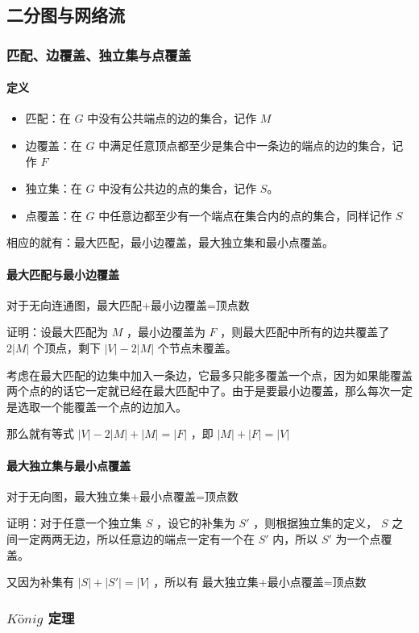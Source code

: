 \documentclass[UTF-8]{ctexart}
\begin{document}
		\subsection{二分图与网络流}
			\subsubsection{匹配、边覆盖、独立集与点覆盖}
			\paragraph{定义}
			\begin{itemize}
				\item 匹配：在 $G$ 中没有公共端点的边的集合，记作 $M$
				\item 边覆盖：在 $G$ 中满足任意顶点都至少是集合中一条边的端点的边的集合，记作 $F$
				\item 独立集：在 $G$ 中没有公共边的点的集合，记作 $S$。
				\item 点覆盖：在 $G$ 中任意边都至少有一个端点在集合内的点的集合，同样记作 $S$
			\end{itemize}
			相应的就有：最大匹配，最小边覆盖，最大独立集和最小点覆盖。
			\paragraph{最大匹配与最小边覆盖} 对于无向连通图，最大匹配+最小边覆盖=顶点数
			
			证明：设最大匹配为 $M$ ，最小边覆盖为 $F$ ，则最大匹配中所有的边共覆盖了 $2|M|$ 个顶点，剩下 $|V|-2|M|$ 个节点未覆盖。
			
			考虑在最大匹配的边集中加入一条边，它最多只能多覆盖一个点，因为如果能覆盖两个点的的话它一定就已经在最大匹配中了。由于是要最小边覆盖，那么每次一定是选取一个能覆盖一个点的边加入。
			
			那么就有等式 $|V|-2|M|+|M|=|F|$ ，即 $|M|+|F|=|V|$
			
			\paragraph{最大独立集与最小点覆盖} 对于无向图，最大独立集+最小点覆盖=顶点数
			
			证明：对于任意一个独立集 $S$ ，设它的补集为 $S'$ ，则根据独立集的定义， $S$ 之间一定两两无边，所以任意边的端点一定有一个在 $S'$ 内，所以 $S'$ 为一个点覆盖。
			
			又因为补集有 $|S|+|S'|=|V|$ ，所以有 最大独立集+最小点覆盖=顶点数
			
			\subsubsection{$K\mbox{ö}nig$ 定理}
\end{document}
